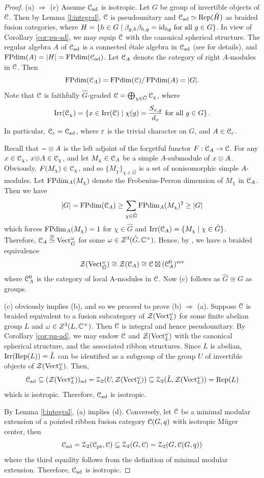 \documentclass[11pt]{article}
\begin{document}
\begin{proof} (a) $\Rightarrow$ (c)
Assume $\mathcal{C}_{{\operatorname{ad}}}$ is isotropic. Let $G$ be group of invertible objects of $\mathcal{C}$. Then by Lemma \ref{l:integral}, ${\mathcal{C}}$ is pseudounitary  and $\mathcal{C}_{{\operatorname{ad}}} \simeq {\operatorname{Rep}}(\hat H)$ as braided fusion categories, where $H=\{h \in G\mid \beta_{g,h}\beta_{h,g} ={\operatorname{id}}_{hg} \text{ for all }g \in G\}$. In view of Corollary \ref{cor:pu-ad}, we may equip $\mathcal{C}$ with the canonical spherical structure. The regular algebra $A$ of $\mathcal{C}_{{\operatorname{ad}}}$ is a connected \'etale algebra in $\mathcal{C}_{{\operatorname{ad}}}$ (see \cite[Sec.~3]{DMNO} for details), and $\operatorname{FPdim}(A) = |H| = \operatorname{FPdim}(\mathcal{C}_{{\operatorname{ad}}})$. Let ${\mathcal{C}}_A$ denote the category of right $A$-modules in $\mathcal{C}$. Then
$$
\operatorname{FPdim}({\mathcal{C}}_{A}) = \operatorname{FPdim}(\mathcal{C})/\operatorname{FPdim}(A) = |G|.
$$
Note that ${\mathcal{C}}$ is faithfully $\hat{G}$-graded 
$
{\mathcal{C}} = \bigoplus_{\chi\in \hat{G}} {\mathcal{C}}_{\chi} 
$, 
where 
\[{\operatorname{Irr}}({\mathcal{C}}_\chi) = \{x \in {\operatorname{Irr}}(\mathcal{C})\mid \chi(g) = \frac{S_{x,g}}{d_x} \text{ for all } g \in G \}\,.\]
In particular,  ${\mathcal{C}}_{{\varepsilon}} = {\mathcal{C}}_{{\operatorname{ad}}}$, where ${\varepsilon}$ is the trivial character on $G$, and $A \in {\mathcal{C}}_{\varepsilon}$.

Recall that $-\otimes A$ is the left adjoint of the forgetful functor $F: {\mathcal{C}}_A \rightarrow {\mathcal{C}}$. 
For any $x \in {\mathcal{C}}_\chi$, $x{\otimes} A \in {\mathcal{C}}_\chi$, and let $M_\chi \in {\mathcal{C}}_A$ be a simple $A$-submodule of $x \otimes A$. Obviously, $F(M_\chi) \in {\mathcal{C}}_\chi$, and so $\{M_\chi\}_{\chi \in \hat{G}}$ is a set of nonisomorphic simple $A$-modules. Let $\operatorname{FPdim}_A(M_\chi)$ denote the Frobenius-Perron dimension of $M_\chi$ in ${\mathcal{C}}_A$. Then we have
$$
|G|= \operatorname{FPdim}({\mathcal{C}}_A) \ge \sum_{\chi \in \hat{G}}\operatorname{FPdim}_A(M_\chi)^2 \ge |G|
$$ 
which forces $\operatorname{FPdim}_A(M_\chi) = 1$ for $\chi \in \hat{G}$ and ${\operatorname{Irr}}({\mathcal{C}}_A) =\{M_\chi\mid \chi \in \hat{G}\}$. Therefore, ${\mathcal{C}}_A \stackrel{{\otimes}}{\simeq} {\operatorname{Vect}}_{\hat G}^\omega$ for some $\omega \in Z^3(\hat G,{\mathbb{C}}^\times)$. Hence, by \cite[Cor.~3.30]{DMNO}, we have a braided equivalence
\[\zdr(\Vec_{\hat{G}}^{\w}) \cong \zdr(\cC_A) \cong \cC \bt (\cC_A^{0})^{\rev}\]
where $\mathcal{C}_A^0$ is the category of local A-modules in $\mathcal{C}$. Now (c) follows as $\hat{G} \cong G$ as groups.

(c) obviously implies (b), and so we proceed to prove (b) $\Rightarrow$ (a). Suppose $\mathcal{C}$ is braided equivalent to a fusion subcategory of $\zdr(\Vec_{L}^\w)$ for some finite abelian group $L$ and  $\omega \in Z^3(L, {\mathbb{C}}^\times)$. Then ${\mathcal{C}}$ is integral and hence pseudounitary. By Corollary \ref{cor:pu-ad}, we may 
endow $\mathcal{C}$ and $\zdr(\Vec_{L}^\w)$ with the canonical spherical structure, and the associated ribbon structures. Since $L$ is abelian, ${\operatorname{Irr}}({\operatorname{Rep}}(L))=\hat{L}$ can be identified as a subgroup of the group $U$ of invertible objects of $\zdr(\Vec_{L}^\w)$. Then, 
$$
\cC_{\ad} \subseteq (\zdr(\Vec_{L}^\w))_{\ad} = \cZ_2(U, \zdr(\Vec_{L}^\w)) \subseteq \cZ_2(\hat{L}, \zdr(\Vec_{L}^\w)) = \Rep(L) 
$$
which is isotropic. Therefore, $\mathcal{C}_{{\operatorname{ad}}}$ is isotropic. 

By Lemma \ref{l:integral}, (a) implies (d). Conversely, let $\mathcal{C}$ be a minimal modular extension of a pointed ribbon fusion category $\mathcal{C}(G, q)$ with isotropic M\"uger center, then 
\[\mathcal{C}_{{\operatorname{ad}}} = \mathcal{Z}_2(\mathcal{C}_{\operatorname{pt}}, \mathcal{C}) \subseteq \mathcal{Z}_2(G, \mathcal{C}) = \mathcal{Z}_2(G, \mathcal{C}(G, q))\] 
where the third equality follows from the definition of minimal modular extension. Therefore, $\mathcal{C}_{{\operatorname{ad}}}$ is isotropic.
\end{proof}
\end{document}
